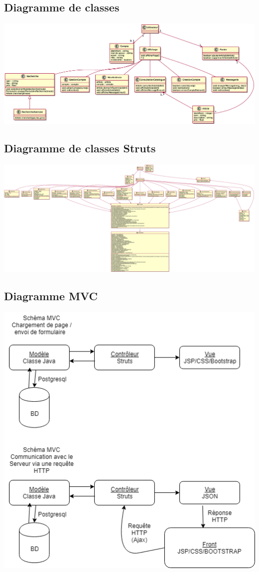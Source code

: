 \subsection{Diagramme de classes}
\includegraphics[width=15cm]{Images/DC}

\subsection{Diagramme de classes Struts}
\includegraphics[width=18cm]{Images/DC_Struts}

\subsection{Diagramme MVC}
\includegraphics[width=15cm]{Images/DiagrammeMVC.png}